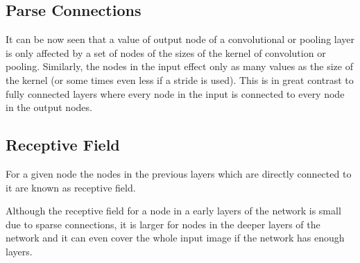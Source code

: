 \documentclass[]{article}
\begin{document}


\subsection{Parse Connections}
It can be now seen that a value of output node of a convolutional or pooling layer
is only affected by a set of nodes of the sizes of the kernel of convolution or
pooling. Similarly, the nodes in the input effect only as many values as the size
of the kernel (or some times even less if a stride is used). This is in great contrast
to fully connected layers where every node in the input is connected to every node
in the output nodes.


\subsection{Receptive Field}
For a given node the nodes in the previous layers which are directly connected
to it are known as receptive field.

Although the receptive field for a node in a early layers of the network is small
due to sparse connections, it is larger for nodes in the deeper layers of the network
and it can even cover the whole input image if the network has enough layers.
\end{document}
